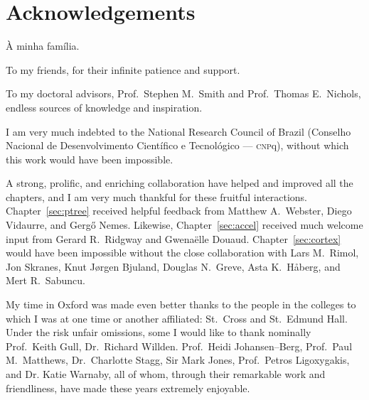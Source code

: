 \chapter*{Acknowledgements}
\setstretch{\lspac}

\noindent
\`{A} minha fam\'{i}lia.

\vspace{3mm}\noindent
To my friends, for their infinite patience and support.

\vspace{3mm}\noindent
To my doctoral advisors, Prof.\ Stephen M.\ Smith and Prof.\ Thomas E.\ Nichols, endless sources of knowledge and inspiration.

\vspace{3mm}\noindent
I am very much indebted to the National Research Council of Brazil (Conselho Nacional de Desenvolvimento Cient\'{i}fico e Tecnol\'{o}gico --- \textsc{cnp}q), without which this work would have been impossible.

\vspace{3mm}\noindent
A strong, prolific, and enriching collaboration have helped and improved all the chapters, and I am very much thankful for these fruitful interactions. Chapter~\ref{sec:ptree} received helpful feedback from Matthew A.\ Webster, Diego Vidaurre, and Gerg\H{o} Nemes. Likewise, Chapter~\ref{sec:accel} received much welcome input from Gerard R.\ Ridgway and Gwena\"{e}lle Douaud. Chapter~\ref{sec:cortex} would have been impossible without the close collaboration with Lars M.\ Rimol, Jon Skranes, Knut J\o{}rgen Bjuland, Douglas N.\ Greve, Asta K.\ H{\aa}berg, and Mert R.\ Sabuncu.

\vspace{3mm}\noindent
My time in Oxford was made even better thanks to the people in the colleges to which I was at one time or another affiliated: St.\ Cross and St.\ Edmund Hall. Under the risk unfair omissions, some I would like to thank nominally Prof.\ Keith Gull, Dr.\ Richard Willden. Prof.\ Heidi Johansen--Berg, Prof.\ Paul M.\ Matthews, Dr.\ Charlotte Stagg, Sir Mark Jones, Prof.\ Petros Ligoxygakis, and Dr. Katie Warnaby, all of whom, through their remarkable work and friendliness, have made these years extremely enjoyable.

